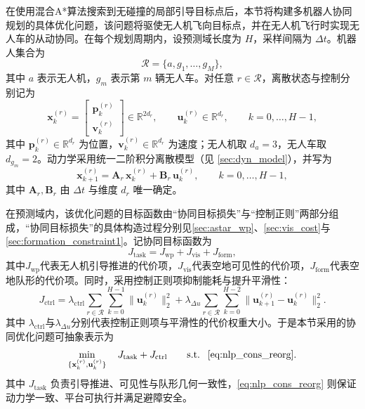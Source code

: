 在使用混合A*算法搜索到无碰撞的局部引导目标点后，本节将构建多机器人协同规划的具体优化问题，该问题将驱使无人机飞向目标点，并在无人机飞行时实现无人车的从动协同。在每个规划周期内，设预测域长度为 \(H\)，采样间隔为 \(\Delta t\)。机器人集合为
\[
\mathcal{R}=\{a,g_1,\dots,g_M\},
\]
其中 \(a\) 表示无人机，\(g_m\) 表示第 \(m\) 辆无人车。对任意 \(r\in\mathcal{R}\)，离散状态与控制分别记为
\[
\mathbf{x}^{(r)}_k=
\begin{bmatrix}
\mathbf{p}^{(r)}_k\\[2pt]
\mathbf{v}^{(r)}_k
\end{bmatrix}\in\mathbb{R}^{2d_r},\qquad
\mathbf{u}^{(r)}_k\in\mathbb{R}^{d_r},\qquad k=0,\dots,H-1,
\]
其中 \(\mathbf{p}^{(r)}_k\in\mathbb{R}^{d_r}\) 为位置，\(\mathbf{v}^{(r)}_k\in\mathbb{R}^{d_r}\) 为速度；无人机取 \(d_a=3\)，无人车取 \(d_{g_m}=2\)。动力学采用统一二阶积分离散模型（见 \autoref{sec:dyn_model}），并写为
\begin{equation}
\mathbf{x}^{(r)}_{k+1}=\mathbf{A}_r\,\mathbf{x}^{(r)}_{k}+\mathbf{B}_r\,\mathbf{u}^{(r)}_{k},\qquad k=0,\dots,H-1,
\label{eq:nlp_dyn}
\end{equation}
其中 \(\mathbf{A}_r,\mathbf{B}_r\) 由 \(\Delta t\) 与维度 \(d_r\) 唯一确定。

在预测域内，该优化问题的目标函数由“协同目标损失”与“控制正则”两部分组成，“协同目标损失”的具体构造过程分别见\autoref{sec:astar_wp}、\autoref{sec:vis_cost}与\autoref{sec:formation_constraint1}。记协同目标函数为
\[
J_{\mathrm{task}} = J_{\mathrm{wp}} + J_{\mathrm{vis}} + J_{\mathrm{form}},
\]
其中\(J_{\mathrm{wp}}\)代表无人机引导推进的代价项，\(J_{\mathrm{vis}}\)代表空地可见性的代价项，\(J_{\mathrm{form}}\)代表空地队形的代价项。同时，采用控制正则项抑制能耗与提升平滑性：
\begin{equation}
J_{\mathrm{ctrl}}
=\lambda_{\mathrm{ctrl}}\sum_{r\in\mathcal{R}}\sum_{k=0}^{H-1}\big\|\mathbf{u}^{(r)}_k\big\|_2^{2}
+\lambda_{\Delta u}\sum_{r\in\mathcal{R}}\sum_{k=0}^{H-2}
\big\|\mathbf{u}^{(r)}_{k+1}-\mathbf{u}^{(r)}_{k}\big\|_2^{2}.
\label{eq:J_ctrl}
\end{equation}
其中 \(\lambda_{\mathrm{ctrl}}\)与\(\lambda_{\Delta u}\)分别代表控制正则项与平滑性的代价权重大小。于是本节采用的协同优化问题可抽象表示为
\begin{equation}
\min_{\{\mathbf{x}^{(r)}_k,\mathbf{u}^{(r)}_k\}}\quad
J_{\mathrm{task}} + J_{\mathrm{ctrl}}
\qquad
\text{s.t. }~ \eqref{eq:nlp_cons_reorg}.
\label{eq:nlp_abs}
\end{equation}
其中 \(J_{\mathrm{task}}\) 负责引导推进、可见性与队形几何一致性，\eqref{eq:nlp_cons_reorg} 则保证动力学一致、平台可执行并满足避障安全。

